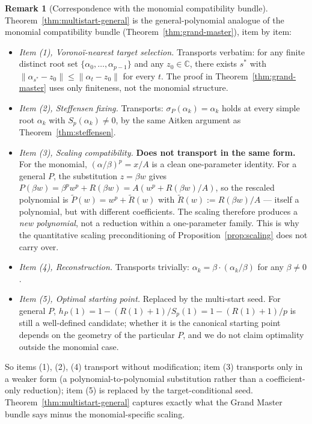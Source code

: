 \documentclass[11pt,a4paper]{article}
\theoremstyle{definition}
\newtheorem{remark}{Remark}[section]
\begin{document}
\begin{remark}[Correspondence with the monomial compatibility bundle]\label{rem:grand-master-correspondence}
Theorem~\ref{thm:multistart-general} is the general-polynomial analogue of the monomial compatibility bundle (Theorem~\ref{thm:grand-master}), item by item:
\begin{itemize}
  \item \emph{Item (1), Voronoï-nearest target selection.} Transports verbatim: for any finite distinct root set $\{\alpha_0, \ldots, \alpha_{p-1}\}$ and any $z_0 \in \mathbb{C}$, there exists $s^\ast$ with $\|\alpha_{s^\ast} - z_0\| \leq \|\alpha_t - z_0\|$ for every $t$. The proof in Theorem~\ref{thm:grand-master} uses only finiteness, not the monomial structure.
  \item \emph{Item (2), Steffensen fixing.} Transports: $\sigma_P(\alpha_k) = \alpha_k$ holds at every simple root $\alpha_k$ with $S_p(\alpha_k) \neq 0$, by the same Aitken argument as Theorem~\ref{thm:steffensen}.
  \item \emph{Item (3), Scaling compatibility.} \textbf{Does not transport in the same form.} For the monomial, $(\alpha/\beta)^p = x/A$ is a clean one-parameter identity. For a general $P$, the substitution $z = \beta w$ gives $P(\beta w) = \beta^p w^p + R(\beta w) = A(w^p + R(\beta w)/A)$, so the rescaled polynomial is $\tilde P(w) = w^p + \tilde R(w)$ with $\tilde R(w) := R(\beta w)/A$ --- itself a polynomial, but with different coefficients. The scaling therefore produces a \emph{new polynomial}, not a reduction within a one-parameter family. This is why the quantitative scaling preconditioning of Proposition~\ref{prop:scaling} does not carry over.
  \item \emph{Item (4), Reconstruction.} Transports trivially: $\alpha_k = \beta \cdot (\alpha_k/\beta)$ for any $\beta \neq 0$.
  \item \emph{Item (5), Optimal starting point.} Replaced by the multi-start seed. For general $P$, $h_P(1) = 1 - (R(1) + 1)/S_p(1) = 1 - (R(1)+1)/p$ is still a well-defined candidate; whether it is the canonical starting point depends on the geometry of the particular $P$, and we do not claim optimality outside the monomial case.
\end{itemize}
So items (1), (2), (4) transport without modification; item (3) transports only in a weaker form (a polynomial-to-polynomial substitution rather than a coefficient-only reduction); item (5) is replaced by the target-conditional seed. Theorem~\ref{thm:multistart-general} captures exactly what the Grand Master bundle says minus the monomial-specific scaling.
\end{remark}
\end{document}
